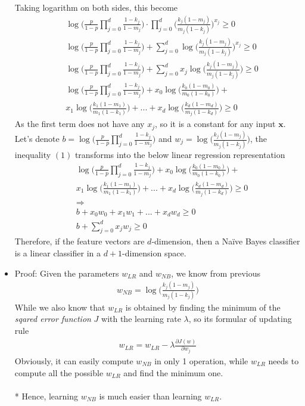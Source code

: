 \documentclass[a4paper]{scrartcl}
\begin{document}
\begin{itemize}
Taking logarithm on both sides, this become
\begin{align*}
 & \ \log{\Bigg(\frac{p}{1-p} {\displaystyle \prod_{j=0}^{d}} \frac{1-k_j}{1-m_j}\Bigg) \cdot {\displaystyle \prod_{j=0}^{d}} \Bigg(\frac{k_j(1-m_j)}{m_j(1-k_j)}\Bigg)^{x_j}} \geq 0\\
 & \ \log{\Bigg(\frac{p}{1-p} {\displaystyle \prod_{j=0}^{d}} \frac{1-k_j}{1-m_j}\Bigg)} + {\displaystyle \sum_{j=0}^{d}} \log{\Bigg(\frac{k_j(1-m_j)}{m_j(1-k_j)}\Bigg)^{x_j}} \geq 0\\
 & \ \log{\Bigg(\frac{p}{1-p} {\displaystyle \prod_{j=0}^{d}} \frac{1-k_j}{1-m_j}\Bigg)} + {\displaystyle \sum_{j=0}^{d}} x_j\log{\Bigg(\frac{k_j(1-m_j)}{m_j(1-k_j)}\Bigg)} \geq 0\\
 & \ \log{\Bigg(\frac{p}{1-p} {\displaystyle \prod_{j=0}^{d}} \frac{1-k_j}{1-m_j}\Bigg)} + x_0\log{\Bigg(\frac{k_0(1-m_0)}{m_0(1-k_0)}\Bigg)} + \\ &\ x_1\log{\Bigg(\frac{k_1(1-m_1)}{m_1(1-k_1)}\Bigg)}+...+ x_d\log{\Bigg(\frac{k_d(1-m_d)}{m_j(1-k_d)}\Bigg)}\geq 0
\end{align*}
As the first term does not have any $x_j$, so it is a constant for any input $\textbf{x}$.\\
Let's denote $b=\log{\Big(\frac{p}{1-p} {\displaystyle \prod_{j=0}^{d}} \frac{1-k_j}{1-m_j}\Big)}$ and $w_j=\log{\Big(\frac{k_j(1-m_j)}{m_j(1-k_j)}\Big)}$, the inequality $(1)$ transforms into the below linear regression representation\\
\begin{align*}
 & \ \log{\Bigg(\frac{p}{1-p} {\displaystyle \prod_{j=0}^{d}} \frac{1-k_j}{1-m_j}\Bigg)} + x_0\log{\Bigg(\frac{k_0(1-m_0)}{m_0(1-k_0)}\Bigg)} + \\ &\ x_1\log{\Bigg(\frac{k_1(1-m_1)}{m_1(1-k_1)}\Bigg)}+...+ x_d\log{\Bigg(\frac{k_d(1-m_d)}{m_j(1-k_d)}\Bigg)}\geq 0\\
 & \ \Rightarrow \\
 & \ b + x_0 w_0 + x_1 w_1 +...+ x_d w_d \geq 0\\
 & \ b + {\displaystyle \sum_{j=0}^{d}} x_j w_j \geq 0
\end{align*}
Therefore, if the feature vectors are $d$-dimension, then a Na\"ive Bayes classifier is
a linear classifier in a $d+1$-dimension space.
\item Proof: Given the parameters \textbf{$w_{LR}$} and \textbf{$w_{NB}$}, we know from previous
\begin{align*}
w_{NB}=\log{\Big(\frac{k_j(1-m_j)}{m_j(1-k_j)}\Big)}
\end{align*}
While we also know that \textbf{$w_{LR}$} is obtained by finding the minimum of the \textsl{sqared error function} $J$ with the learning rate $\lambda$, so its formular of updating rule
\begin{align*}
  w_{LR}= w_{LR} - \lambda \frac{\partial J(w) }{\partial w_j}
\end{align*}
Obviously, it can easily compute \textbf{$w_{NB}$} in only 1 operation, while \textbf{$w_{LR}$} needs to compute all the possible \textbf{$w_{LR}$} and find the minimum one.\\ 
\\*
Hence, learning \textbf{$w_{NB}$} is much easier than learning \textbf{$w_{LR}$}.
\end{itemize}
\end{document}
